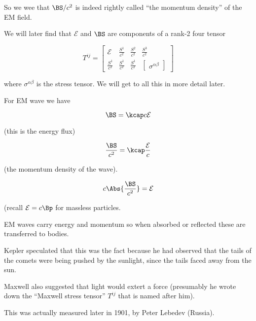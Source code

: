 So we wee that $\BS/c^2$ is indeed rightly called ``the momentum density'' of the EM field.

We will later find that $\mathcal{E}$ and $\BS$ are components of a rank-2 four tensor

\begin{equation}\label{eqn:relativisticElectrodynamicsL17:n}
T^{ij} = 
\begin{bmatrix}
\mathcal{E} & \frac{S^1}{c^2} & \frac{S^2}{c^2} & \frac{S^3}{c^2} \\
\frac{S^1}{c^2}  &
\frac{S^1}{c^2}  &
\frac{S^1}{c^2}  &
\begin{bmatrix}
\sigma^{\alpha\beta}
\end{bmatrix}
\end{bmatrix}
\end{equation}

where $\sigma^{\alpha\beta}$ is the stress tensor.  We will get to all this in more detail later.

For EM wave we have

\begin{equation}\label{eqn:relativisticElectrodynamicsL17:n}
\BS = \kcap c \mathcal{E}
\end{equation}

(this is the energy flux)

\begin{equation}\label{eqn:relativisticElectrodynamicsL17:n}
\frac{\BS}{c^2} = \kcap \frac{\mathcal{E}}{c}
\end{equation}

(the momentum density of the wave).

\begin{equation}\label{eqn:relativisticElectrodynamicsL17:n}
c \Abs{\frac{\BS}{c^2}} = \mathcal{E}
\end{equation}

(recall $\mathcal{E} = c\mathcal{\Bp}$ for massless particles.

EM waves carry energy and momentum so when absorbed or reflected these are transferred to bodies.

Kepler speculated that this was the fact because he had observed that the tails of the comets were being pushed by the sunlight, since the tails faced away from the sun.

Maxwell also suggested that light would extert a force (presumably he wrote down the ``Maxwell stress tensor'' $T^{ij}$ that is named after him).

This was actually measured later in 1901, by Peter Lebedev (Russia).

